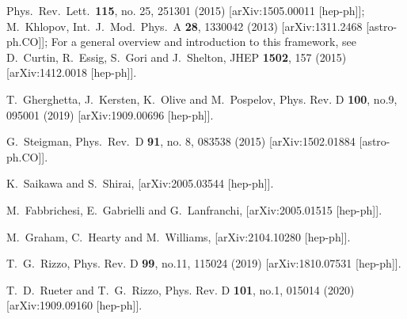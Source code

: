 \documentclass[14pt]{article}
\begin{document}
{\begin{thebibliography}{99}
  Phys.\ Rev.\ Lett.\  {\bf 115}, no. 25, 251301 (2015)
  [arXiv:1505.00011 [hep-ph]];
  M.~Khlopov,
  Int.\ J.\ Mod.\ Phys.\ A {\bf 28}, 1330042 (2013)
  [arXiv:1311.2468 [astro-ph.CO]];
 For a general overview and introduction to this framework, see  
  D.~Curtin, R.~Essig, S.~Gori and J.~Shelton,
  JHEP {\bf 1502}, 157 (2015)
  [arXiv:1412.0018 [hep-ph]].
  

T.~Gherghetta, J.~Kersten, K.~Olive and M.~Pospelov,
Phys. Rev. D \textbf{100}, no.9, 095001 (2019)
[arXiv:1909.00696 [hep-ph]].


  G.~Steigman,
  Phys.\ Rev.\ D {\bf 91}, no. 8, 083538 (2015)
  [arXiv:1502.01884 [astro-ph.CO]].
  
K.~Saikawa and S.~Shirai,
[arXiv:2005.03544 [hep-ph]].
 
M.~Fabbrichesi, E.~Gabrielli and G.~Lanfranchi,
[arXiv:2005.01515 [hep-ph]].


M.~Graham, C.~Hearty and M.~Williams,
[arXiv:2104.10280 [hep-ph]].


T.~G.~Rizzo,
Phys. Rev. D \textbf{99}, no.11, 115024 (2019)
[arXiv:1810.07531 [hep-ph]].

T.~D.~Rueter and T.~G.~Rizzo,
Phys. Rev. D \textbf{101}, no.1, 015014 (2020)
[arXiv:1909.09160 [hep-ph]].


\end{thebibliography}}
\end{document}
